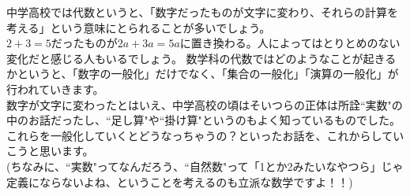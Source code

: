 中学高校では代数というと、「数字だったものが文字に変わり、それらの計算を考える」という意味にとられることが多いでしょう。\\
$2 + 3 = 5$だったものが$2a + 3a = 5a$に置き換わる。人によってはとりとめのない変化だと感じる人もいるでしょう。
数学科の代数ではどのようなことが起きるかというと、「数字の一般化」だけでなく、「集合の一般化」「演算の一般化」が行われていきます。\\
数字が文字に変わったとはいえ、中学高校の頃はそいつらの正体は所詮``実数"の中のお話だったし、``足し算"や``掛け算"というのもよく知っているものでした。これらを一般化していくとどうなっちゃうの？といったお話を、これからしていこうと思います。\\
(ちなみに、``実数"ってなんだろう、``自然数"って「1とか2みたいなやつら」じゃ定義にならないよね、ということを考えるのも立派な数学ですよ！！)

